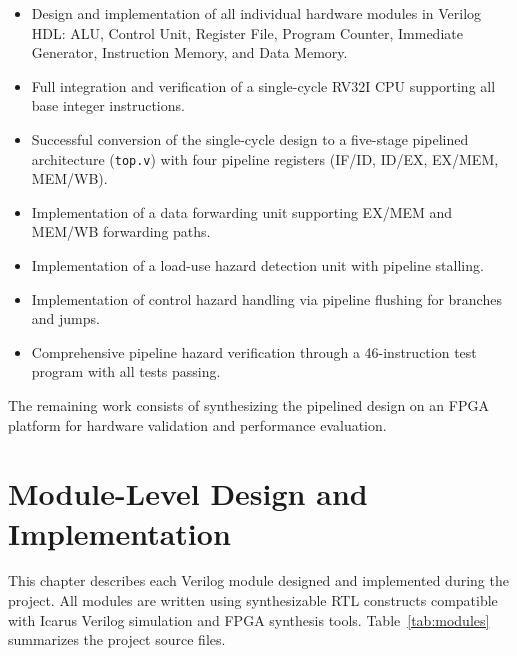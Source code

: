 \documentclass[12pt,a4paper]{report}
\begin{document}
\begin{itemize}
    \item Design and implementation of all individual hardware modules in Verilog HDL:
          ALU, Control Unit, Register File, Program Counter, Immediate Generator,
          Instruction Memory, and Data Memory.
    \item Full integration and verification of a single-cycle RV32I CPU supporting
          all base integer instructions.
    \item Successful conversion of the single-cycle design to a five-stage pipelined
          architecture (\texttt{top.v}) with four pipeline registers (IF/ID, ID/EX,
          EX/MEM, MEM/WB).
    \item Implementation of a data forwarding unit supporting EX/MEM and MEM/WB
          forwarding paths.
    \item Implementation of a load-use hazard detection unit with pipeline stalling.
    \item Implementation of control hazard handling via pipeline flushing for branches
          and jumps.
    \item Comprehensive pipeline hazard verification through a 46-instruction test
          program with all tests passing.
\end{itemize}

The remaining work consists of synthesizing the pipelined design on an FPGA platform
for hardware validation and performance evaluation.


\chapter{Module-Level Design and Implementation}

This chapter describes each Verilog module designed and implemented during the
project. All modules are written using synthesizable RTL constructs compatible with
Icarus Verilog simulation and FPGA synthesis tools. Table~\ref{tab:modules}
summarizes the project source files.
\end{document}
